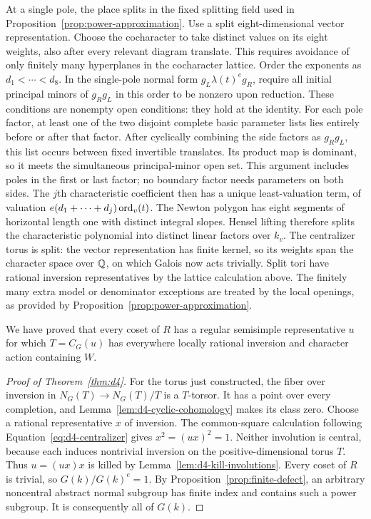 At a single pole, the place splits in the fixed splitting field used in
Proposition~\ref{prop:power-approximation}.  Use a split eight-dimensional
vector representation.  Choose the cocharacter to take distinct values
on its eight weights, also after every relevant diagram translate.  This
requires avoidance of only finitely many hyperplanes in the cocharacter
lattice.  Order the exponents as $d_1<\cdots<d_8$.  In the single-pole
normal form $g_L\lambda(t)^e g_R$, require all initial principal minors
of $g_Rg_L$ in this order to be nonzero upon reduction.  These conditions
are nonempty open conditions: they hold at the identity.  For each pole
factor, at least one of the two disjoint complete basic parameter lists
lies entirely before or after that factor.  After cyclically combining
the side factors as $g_Rg_L$, this list occurs between fixed invertible
translates.  Its product map is dominant, so it meets the simultaneous
principal-minor open set.  This argument includes poles in the first or
last factor; no boundary factor needs parameters on both sides.  The
$j$th characteristic coefficient then has a unique
least-valuation term, of valuation
$e(d_1+\cdots+d_j)\operatorname{ord}_v(t)$.  The Newton polygon has eight segments of
horizontal length one with distinct integral slopes.  Hensel lifting
therefore splits the characteristic polynomial into distinct linear
factors over $k_v$.  The centralizer torus is split: the vector
representation has finite kernel, so its weights span the character
space over $\mathbb Q$, on which Galois now acts trivially.  Split tori have
rational inversion representatives by the lattice calculation above.
The finitely many extra model or denominator exceptions are treated by
the local openings, as provided by
Proposition~\ref{prop:power-approximation}.

We have proved that every coset of $R$ has a regular semisimple
representative $u$ for which $T=C_G(u)$ has everywhere locally rational
inversion and character action containing $W$.

\begin{proof}[Proof of Theorem~\ref{thm:d4}]
For the torus just constructed, the fiber over inversion in
$N_G(T)\to N_G(T)/T$ is a $T$-torsor.  It has a point over every
completion, and Lemma~\ref{lem:d4-cyclic-cohomology} makes its class zero.
Choose a rational representative $x$ of inversion.  The common-square
calculation following Equation~\eqref{eq:d4-centralizer} gives
$x^2=(ux)^2=1$.  Neither involution is central, because each induces
nontrivial inversion on the positive-dimensional torus $T$.  Thus
$u=(ux)x$ is killed by Lemma~\ref{lem:d4-kill-involutions}.  Every coset
of $R$ is trivial, so $G(k)/G(k)^e=1$.  By
Proposition~\ref{prop:finite-defect}, an arbitrary noncentral abstract
normal subgroup has finite index and contains such a power subgroup.
It is consequently all of $G(k)$.
\end{proof}

